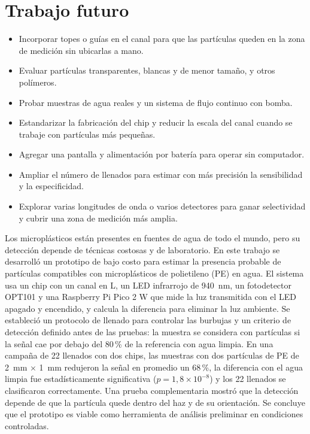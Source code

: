 \section{Trabajo futuro}

\begin{itemize}
  \item Incorporar topes o guías en el canal para que las partículas queden en la zona de
    medición sin ubicarlas a mano.
  \item Evaluar partículas transparentes, blancas y de menor tamaño, y otros polímeros.
  \item Probar muestras de agua reales y un sistema de flujo continuo con bomba.
  \item Estandarizar la fabricación del chip y reducir la escala del canal cuando se
    trabaje con partículas más pequeñas.
  \item Agregar una pantalla y alimentación por batería para operar sin computador.
  \item Ampliar el número de llenados para estimar con más precisión la sensibilidad y la
    especificidad.
  \item Explorar varias longitudes de onda o varios detectores para ganar selectividad y
    cubrir una zona de medición más amplia.
\end{itemize}



Los microplásticos están presentes en fuentes de agua de todo el mundo, pero su
detección depende de técnicas costosas y de laboratorio. En este trabajo se desarrolló
un prototipo de bajo costo para estimar la presencia probable de partículas compatibles
con microplásticos de polietileno (PE) en agua. El sistema usa un chip con un canal en L,
un LED infrarrojo de 940~nm, un fotodetector OPT101 y una Raspberry Pi Pico 2 W que mide
la luz transmitida con el LED apagado y encendido, y calcula la diferencia para eliminar
la luz ambiente. Se estableció un protocolo de llenado para controlar las burbujas y un
criterio de detección definido antes de las pruebas: la muestra se considera con
partículas si la señal cae por debajo del 80\,\% de la referencia con agua limpia. En una
campaña de 22 llenados con dos chips, las muestras con dos partículas de PE de 2~mm $\times$ 1~mm
redujeron la señal en promedio un 68\,\%, la diferencia con el agua limpia fue
estadísticamente significativa ($p = 1{,}8 \times 10^{-8}$) y los 22 llenados se
clasificaron correctamente. Una prueba complementaria mostró que la detección depende de
que la partícula quede dentro del haz y de su orientación. Se concluye que el prototipo
es viable como herramienta de análisis preliminar en condiciones controladas.

